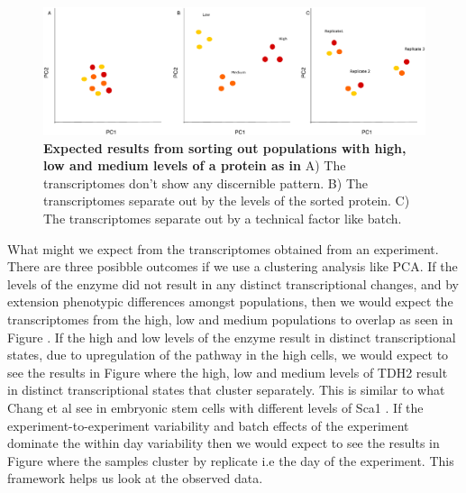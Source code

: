 \begin{figure}[t!]  
    \centering
    \includegraphics[width=\linewidth, scale=0.5]{figures/intro/intro_clustering_expectedresults.pdf}
    \caption[Expected results from sorting out populations with high, low and medium levels of a protein as in ]{%
        \textbf{Expected results from sorting out populations with high, low and medium levels of a protein as in }
        A) The transcriptomes don't show any discernible pattern. B) The transcriptomes separate out by the levels of the sorted protein. C) The transcriptomes separate out by a technical factor like batch.
    }
    \label{fig:intro4}
\end{figure}

What might we expect from the transcriptomes obtained from an experiment. There are three posibble outcomes if we use a clustering analysis like PCA. If the levels of the enzyme did not result in any distinct transcriptional changes, and by extension phenotypic differences amongst populations, then we would expect the transcriptomes from the high, low and medium populations to overlap as seen in Figure . If the high and low levels of the enzyme result in distinct transcriptional states, due to upregulation of the pathway in the high cells, we would expect to see the results in Figure  where the high, low and medium levels of TDH2 result in distinct transcriptional states that cluster separately. This is similar to what Chang et al see in embryonic stem cells with different levels of Sca1 \cite{chang2008n}. If the experiment-to-experiment variability and batch effects of the experiment dominate the within day variability then we would expect to see the results in Figure  where the samples cluster by replicate i.e the day of the experiment. This framework helps us look at the observed data.

